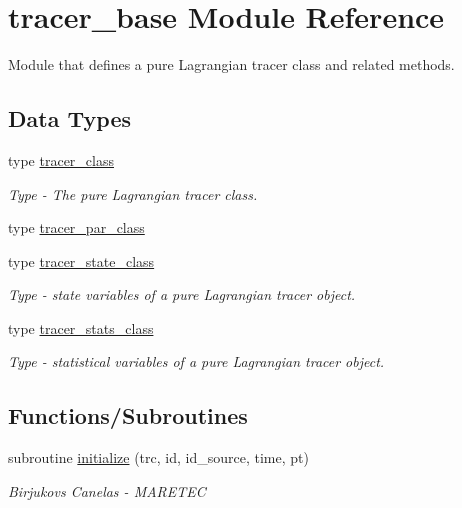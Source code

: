 \hypertarget{namespacetracer__base}{}\section{tracer\+\_\+base Module Reference}
\label{namespacetracer__base}


Module that defines a pure Lagrangian tracer class and related methods.  


\subsection*{Data Types}
\begin{DoxyCompactItemize}
\item 
type \mbox{\hyperlink{structtracer__base_1_1tracer__class}{tracer\+\_\+class}}
\begin{DoxyCompactList}\small\item\em Type -\/ The pure Lagrangian tracer class. \end{DoxyCompactList}\item 
type \mbox{\hyperlink{structtracer__base_1_1tracer__par__class}{tracer\+\_\+par\+\_\+class}}
\item 
type \mbox{\hyperlink{structtracer__base_1_1tracer__state__class}{tracer\+\_\+state\+\_\+class}}
\begin{DoxyCompactList}\small\item\em Type -\/ state variables of a pure Lagrangian tracer object. \end{DoxyCompactList}\item 
type \mbox{\hyperlink{structtracer__base_1_1tracer__stats__class}{tracer\+\_\+stats\+\_\+class}}
\begin{DoxyCompactList}\small\item\em Type -\/ statistical variables of a pure Lagrangian tracer object. \end{DoxyCompactList}\end{DoxyCompactItemize}
\subsection*{Functions/\+Subroutines}
\begin{DoxyCompactItemize}
\item 
subroutine \mbox{\hyperlink{namespacetracer__base_ad712d20080a9daa44024d61afae670a4}{initialize}} (trc, id, id\+\_\+source, time, pt)
\begin{DoxyCompactList}\small\item\em Birjukovs Canelas -\/ M\+A\+R\+E\+T\+EC \end{DoxyCompactList}\end{DoxyCompactItemize}
